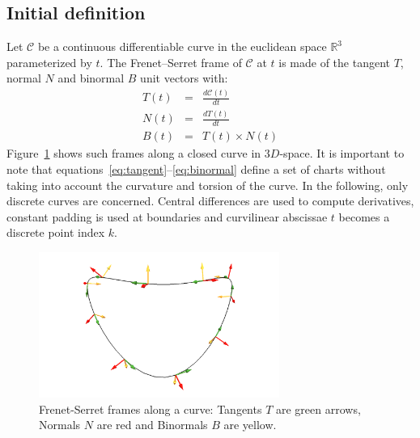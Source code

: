 \documentclass{InsightArticle}
\begin{document}
\subsection{Initial definition}
%
Let $\mathcal{C}$ be a continuous differentiable curve in the euclidean space
$\mathbb{R}^3$ parameterized by $t$. The Frenet--Serret frame of $\mathcal{C}$
at $t$ is made of the 
tangent $T$, normal $N$ and binormal $B$ unit vectors with:
\begin{eqnarray}
T(t) &=& \frac{d\mathcal{C}(t)}{dt}\label{eq:tangent}\\
N(t) &=& \frac{dT(t)}{dt}\label{eq:normal}\\
B(t) &=& T(t)\times N(t)\label{eq:binormal}
\end{eqnarray}
%
Figure~\ref{fig:frenet-serret_frames} shows such frames along a closed curve
in $3D$-space. It is important to note that
equations~\eqref{eq:tangent}--\eqref{eq:binormal}
define a set of charts without taking into account the curvature and torsion of
the curve. In the following, only discrete curves are concerned. Central
differences are used to compute derivatives, constant padding is used at
boundaries and curvilinear abscissae $t$ becomes a discrete point index $k$.
%
\begin{figure}
\centering
\includegraphics[width=0.7\textwidth]{Images/frenet-serret_frames}
\caption{Frenet-Serret frames along a curve: Tangents $T$ are green arrows,
Normals $N$ are red and Binormals $B$ are yellow.}
\label{fig:frenet-serret_frames}
\end{figure}
%
\end{document}
